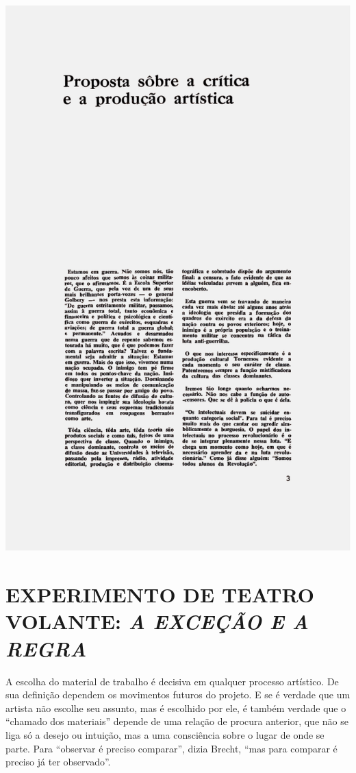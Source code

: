\includegraphics[width=\columnwidth]{media/DOC2.pdf}

\chapter{EXPERIMENTO DE TEATRO VOLANTE: \textit{A EXCEÇÃO E A REGRA}}

A escolha do material de trabalho é decisiva em qualquer processo
artístico. De sua definição dependem os movimentos futuros do projeto. E
se é verdade que um artista não escolhe seu assunto, mas é escolhido por
ele, é também verdade que o “chamado dos materiais” depende de uma
relação de procura anterior, que não se liga só a desejo ou intuição,
mas a uma consciência sobre o lugar de onde se parte. Para “observar é
preciso comparar”, dizia Brecht, “mas para comparar é preciso já ter
observado”.

